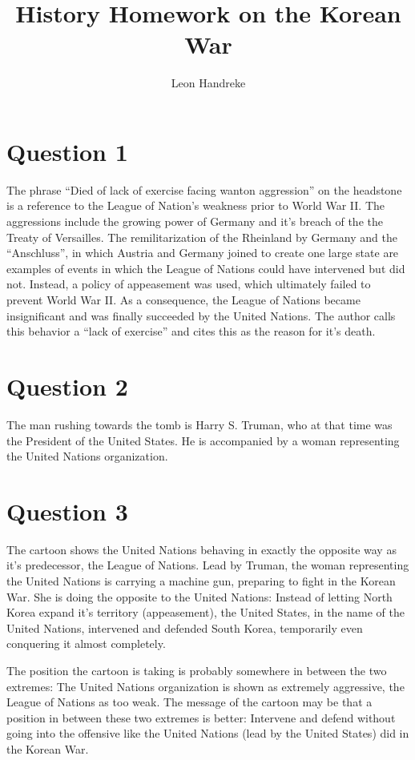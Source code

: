 \documentclass[11pt]{article}
\title{History Homework on the Korean War}
\author{Leon Handreke}
\date{}                                           %
\begin{document}
\onehalfspacing
\maketitle
{}\selectfont

\section{Question 1}
The phrase ``Died of lack of exercise facing wanton aggression'' on the headstone is a reference to the League of Nation's weakness prior to World War II. The aggressions include the growing power of Germany and it's breach of the the Treaty of Versailles. The remilitarization of the Rheinland by Germany and the ``Anschluss'', in which Austria and Germany joined to create one large state are examples of events in which the League of Nations could have intervened but did not. Instead, a policy of appeasement was used, which ultimately failed to prevent World War II. As a consequence, the League of Nations became insignificant and was finally succeeded by the United Nations. The author calls this behavior a ``lack of exercise'' and cites this as the reason for it's death.

\section*{Question 2}
The man rushing towards the tomb is Harry S. Truman, who at that time was the President of the United States. He is accompanied by a woman representing the United Nations organization.

\section*{Question 3}
The cartoon shows the United Nations behaving in exactly the opposite way as it's predecessor, the League of Nations. Lead by Truman, the woman representing the United Nations is carrying a machine gun, preparing to fight in the Korean War. She is doing the opposite to the United Nations: Instead of letting North Korea expand it's territory (appeasement), the United States, in the name of the United Nations, intervened and defended South Korea, temporarily even conquering it almost completely.

The position the cartoon is taking is probably somewhere in between the two extremes: The United Nations organization is shown as extremely aggressive, the League of Nations as too weak. The message of the cartoon may be that a position in between these two extremes is better: Intervene and defend without going into the offensive like the United Nations (lead by the United States) did in the Korean War.
\end{document}
